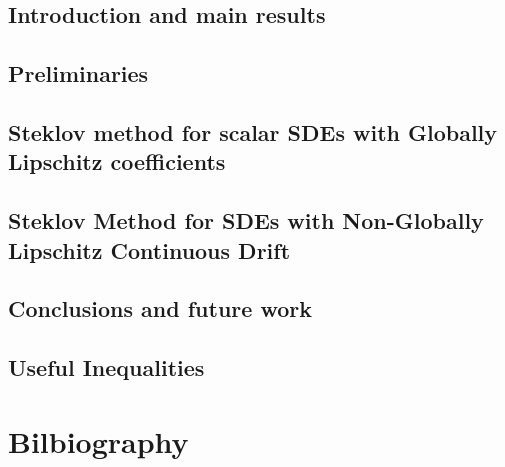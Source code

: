 
 
% 

	\frontmatter
	\pagestyle{empty} 
	
	
	
	\cleardoublepage
	\pagestyle{fancy}
	\tableofcontents
	\listoffigures
	\listoftables
	\listoftodos
	
	\cleardoublepage
	\mainmatter
	\chapter{Introduction and main results}
		
	\chapter{Preliminaries}
		
	\chapter{Steklov method for scalar SDEs with Globally Lipschitz coefficients}
		
	\chapter{Steklov Method for SDEs with Non-Globally Lipschitz Continuous Drift}
		
	\chapter{Conclusions and future work}
			
	\begin{appendices}
		\chapter{Useful Inequalities}
			
	\end{appendices}
	\part*{Bilbiography}
	
	
